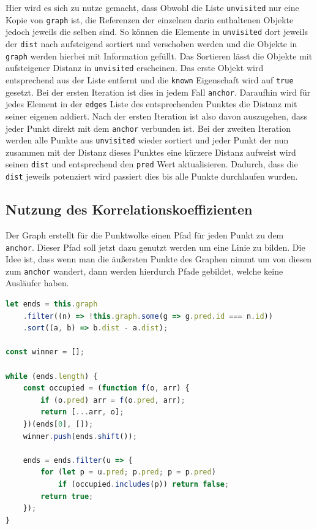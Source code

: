 Hier wird es sich zu nutze gemacht, dass Obwohl die Liste \lstinline{unvisited} nur eine Kopie von \lstinline{graph} ist, die Referenzen der einzelnen darin enthaltenen Objekte jedoch jeweils die selben sind.
So können die Elemente in \lstinline{unvisited} dort jeweils der \lstinline{dist} nach aufsteigend sortiert und verschoben werden und die Objekte in \lstinline{graph} werden hierbei mit Information gefüllt.
Das Sortieren lässt die Objekte mit aufsteigener Distanz in \lstinline{unvisited} erscheinen.
Das erste Objekt wird entsprechend aus der Liste entfernt und die \lstinline{known} Eigenschaft wird auf \lstinline{true} gesetzt.
Bei der ersten Iteration ist dies in jedem Fall \lstinline{anchor}.
Daraufhin wird für jedes Element in der \lstinline{edges} Liste des entsprechenden Punktes die Distanz mit seiner eigenen addiert.
Nach der ersten Iteration ist also davon auszugehen, dass jeder Punkt direkt mit dem \lstinline{anchor} verbunden ist.
Bei der zweiten Iteration werden alle Punkte aus \lstinline{unvisited} wieder sortiert und jeder Punkt der nun zusammen mit der Distanz dieses Punktes eine kürzere Distanz aufweist wird seinen \lstinline{dist} und entsprechend den \lstinline{pred} Wert aktualisieren.
Dadurch, dass die \lstinline{dist} jeweils potenziert wird passiert dies bis alle Punkte durchlaufen wurden.

\subsection{Nutzung des Korrelationskoeffizienten}

Der Graph erstellt für die Punktwolke einen Pfad für jeden Punkt zu dem \lstinline{anchor}.
Dieser Pfad soll jetzt dazu genutzt werden um eine Linie zu bilden.
Die Idee ist, dass wenn man die äu{\ss}ersten Punkte des Graphen nimmt um von diesen zum \lstinline{anchor} wandert, dann werden hierdurch Pfade gebildet, welche keine Ausläufer haben.

\begin{lstlisting}[language=JavaScript, caption={Bestimmung der äu{\ss}ersten Knoten zur Bestimmung von Geraden durch den Korrelationskoeffizienten in der \lstinline{groupsByCorrelation} Funktion innerhalb der \lstinline{Dijkstra} Klasse.}, label={lst:dijkstra_correlation_part1}]
let ends = this.graph
    .filter((n) => !this.graph.some(g => g.pred.id === n.id))
    .sort((a, b) => b.dist - a.dist);

const winner = [];

while (ends.length) {
    const occupied = (function f(o, arr) {
        if (o.pred) arr = f(o.pred, arr);
        return [...arr, o];
    })(ends[0], []);
    winner.push(ends.shift());

    ends = ends.filter(u => {
        for (let p = u.pred; p.pred; p = p.pred)
            if (occupied.includes(p)) return false;
        return true;
    });
}
\end{lstlisting}

